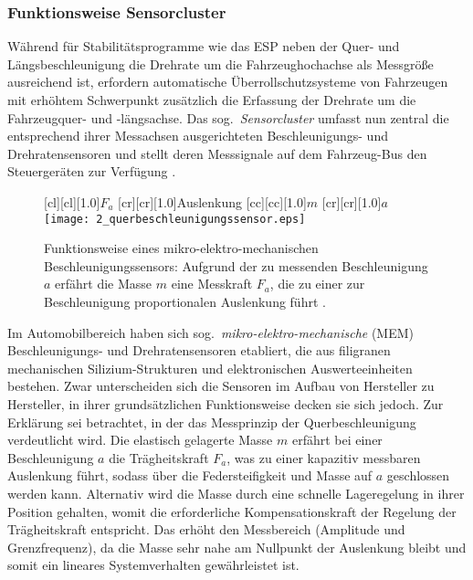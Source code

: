 \subsubsection{Funktionsweise Sensorcluster\cite{Sensorcluster}}
Während für Stabilitätsprogramme wie das ESP neben der Quer- und Längsbeschleunigung die Drehrate um die Fahrzeughochachse als Messgröße ausreichend ist, erfordern automatische Überrollschutzsysteme von Fahrzeugen mit erhöhtem Schwerpunkt zusätzlich die Erfassung der Drehrate um die Fahrzeugquer- und -längsachse. Das sog.\ \emph{Sensorcluster} umfasst nun zentral die entsprechend ihrer Messachsen %
ausgerichteten Beschleunigungs- und Drehratensensoren  und stellt deren Messsignale auf dem Fahrzeug-Bus den Steuergeräten zur Verfügung \cite{reif2010sensoren}. 
\begin{figure}[ht]
\newcommand{\smallsize}{.75}
	[cl][cl][1.0]{$F_a$}
	[cr][cr][1.0]{Auslenkung}
	[cc][cc][1.0]{$m$}
	[cr][cr][1.0]{$a$}
\centering
\texttt{[image: 2\_querbeschleunigungssensor.eps]}
 \caption[Funktionsweise eines Beschleunigungssensors]{Funktionsweise eines mikro-elektro-mechanischen Beschleunigungssensors: Aufgrund der zu messenden Beschleunigung $a$ erfährt die Masse $m$ eine Messkraft $F_a$, die zu einer zur Beschleunigung proportionalen Auslenkung führt \cite{reif2010sensoren}.}
 \label{fig:querbeschleunigungssensor}
\end{figure}
%
Im Automobilbereich haben sich sog.\ \emph{mikro-elektro-mechanische} (MEM) Beschleunigungs- und Drehratensensoren etabliert, die aus filigranen mechanischen Silizium-Strukturen und elektronischen Auswerteeinheiten bestehen. Zwar unterscheiden sich die Sensoren im Aufbau von Hersteller zu Hersteller, in ihrer grundsätzlichen Funktionsweise decken sie sich jedoch. Zur Erklärung sei  betrachtet, in der 
das Messprinzip der Querbeschleunigung verdeutlicht wird. Die elastisch gelagerte Masse $m$ erfährt bei einer Beschleunigung $a$ die Trägheitskraft $F_a$, was zu einer kapazitiv messbaren Auslenkung führt, sodass über die Federsteifigkeit und Masse auf $a$ geschlossen werden kann. Alternativ wird die Masse durch eine schnelle Lageregelung in ihrer Position gehalten, womit die erforderliche Kompensationskraft der Regelung der Trägheitskraft entspricht. Das erhöht den Messbereich (Amplitude und Grenzfrequenz), da die Masse sehr nahe am Nullpunkt der Auslenkung bleibt und somit ein lineares Systemverhalten gewährleistet ist.  \\
%

